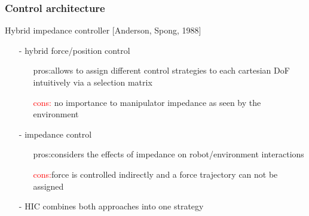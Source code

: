 \begin{frame}
  \frametitle{Control architecture}
  Hybrid impedance controller [Anderson, Spong, 1988]
  \begin{itemize}
  \item [-] hybrid force/position control
    \begin{itemize}
    \item[] \textcolor{dgreen}{pros:}allows to assign different control strategies to each cartesian DoF
      intuitively via a selection matrix
    \item[] \textcolor{red}{cons:} no importance to manipulator impedance as seen by the environment
    \end{itemize}
  \item [-] impedance control
    \begin{itemize}
    \item[] \textcolor{dgreen}{pros:}considers the effects of impedance on robot/environment interactions
    \item[] \textcolor{red}{cons:}force is controlled indirectly and a force trajectory can not be assigned
    \end{itemize}
  \item [-] HIC combines both approaches into one strategy
  \end{itemize}
\end{frame}
